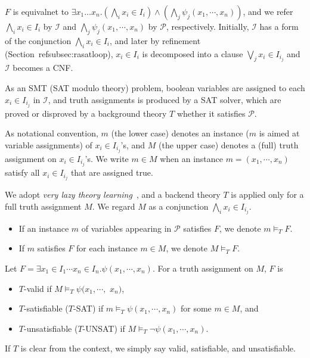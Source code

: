 \documentclass[runningheads,a4paper,oribibl]{llncs}
\begin{document}
$F$ is equivalnet to 
$\exists x_1 \ldots x_n. (\bigwedge \limits_i x_i \in I_i) \wedge (\bigwedge \limits_j \psi_j(x_1,\cdots,x_n))$, 
and we refer $\bigwedge \limits_i x_i \in I_i$ by ${\mathcal I}$ and 
$\bigwedge \limits_j \psi_j(x_1,\cdots,x_n)$ by ${\mathcal P}$, 
respectively. 
Initially, ${\mathcal I}$ has a form of the conjunction $\bigwedge \limits_i x_i \in I_i$, and later by refinement
(Section~ref{subsec:rasatloop}), $x_i \in I_i$ is decomposed into a clause $\bigvee_j x_i \in I_{i_j}$
and ${\mathcal I}$ becomes a CNF. 

As an SMT (SAT modulo theory) problem, 
boolean variables are assigned to each $x_i \in I_{i_j}$ in ${\mathcal I}$, 
and truth assignments is produced by a SAT solver, 
which are proved or disproved by a background theory $T$ whether it satisfies ${\mathcal P}$. 

As notational convention, $m$ (the lower case) denotes an instance 
($m$ is aimed at variable assignments) of $x_i \in I_{i_j}$'s, and 
$M$ (the upper case) denotes a (full) truth assignment on $x_i \in I_{i_j}$'s. 
We write $m \in M$ when an instance $m = (x_1,\cdots,x_n)$ satisfy 
all $x_i \in I_{i_j}$ that are assigned true. 


We adopt {\em very lazy theory learning}~\cite{dpll}, and 
a backend theory $T$ is applied only for a full truth assignment $M$. 
We regard $M$ as a conjunction $\bigwedge \limits_i x_i \in I_{i_j}$. 
\begin{itemize}
\item If an instance $m$ of variables appearing in ${\mathcal P}$ 
satisfies $F$, we denote $m \models_T F$. 
\item If $m$ satisfies $F$ for each instance $m \in M$, we denote $M \models_T F$. 
\end{itemize}

\begin{definition} \label{def:app}
Let $F = \exists x_1 \in I_1 \cdots x_n \in I_n. \psi(x_1,\cdots,x_n)$. 
For a truth assignment on $M$, $F$ is 
\begin{itemize}
\item $T$-valid if $M \models_T \psi(x_1,\cdots,$ $x_n)$, 
\item $T$-satisfiable ($T$-SAT) if $m \models_T \psi(x_1,\cdots,x_n)$ 
for some $m \in M$, and 
\item $T$-unsatisfiable ($T$-UNSAT) if $M \models_T \neg \psi(x_1,\cdots,x_n)$. 
\end{itemize}
If $T$ is clear from the context, we simply say valid, satisfiable, and unsatisfiable. 
\end{definition}
\end{document}
